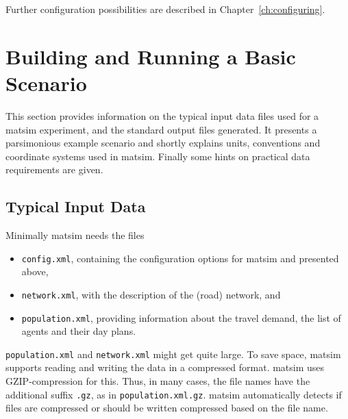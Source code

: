 Further configuration possibilities are described in Chapter~\ref{ch:configuring}.

\section{Building and Running a Basic Scenario}
\label{sec:buildingbasicscenario}
This section provides information on the typical input data files used for a \gls{matsim} experiment, and the standard output files generated. It presents a parsimonious example scenario and shortly explains units, conventions and coordinate systems used in \gls{matsim}. Finally some hints on practical data requirements
are given.

\subsection{Typical Input Data}
\label{sec:inputdata}
Minimally \gls{matsim} needs the files
\begin{itemize}\styleItemize
	\item \lstinline|config.xml|, containing the configuration options for \gls{matsim} and presented above,
	\item \lstinline|network.xml|, with the description of the (road) network, and
	\item \lstinline|population.xml|, providing information about	the travel demand, \ie the list of agents and their day plans.
\end{itemize}


\lstinline|population.xml| and \lstinline|network.xml| 
might get quite large. To save space, \gls{matsim} supports reading and writing the data in a compressed format. \gls{matsim} uses GZIP-compression for this. Thus, in many cases, the file names have the additional suffix \lstinline|.gz|, as in \lstinline|population.xml.gz|. \gls{matsim} automatically detects if files are compressed or should be written compressed based on the file name.

